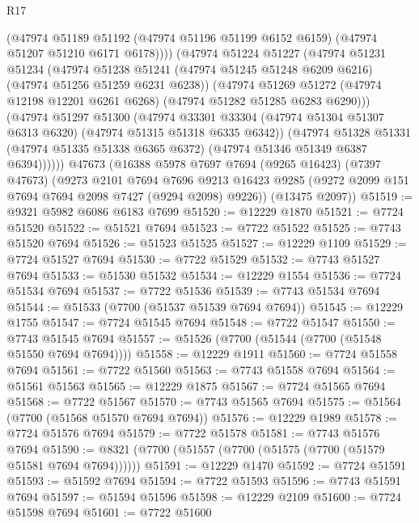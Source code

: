 \begin{lexlean}{R17}
\begin{coremodule}
            (@47974
              @51189
              @51192
              (@47974 @51196 @51199 @6152 @6159)
              (@47974 @51207 @51210 @6171 @6178))))
        (@47974
          @51224
          @51227
          (@47974
            @51231
            @51234
            (@47974
              @51238
              @51241
              (@47974 @51245 @51248 @6209 @6216)
              (@47974 @51256 @51259 @6231 @6238))
            (@47974
              @51269
              @51272
              (@47974 @12198 @12201 @6261 @6268)
              (@47974 @51282 @51285 @6283 @6290)))
          (@47974
            @51297
            @51300
            (@47974
              @33301
              @33304
              (@47974 @51304 @51307 @6313 @6320)
              (@47974 @51315 @51318 @6335 @6342))
            (@47974
              @51328
              @51331
              (@47974 @51335 @51338 @6365 @6372)
              (@47974 @51346 @51349 @6387 @6394))))))
    @47673
    (@16388
      @5978
      @7697
      @7694
      (@9265 @16423)
      (@7397 @47673)
      (@9273
        @2101
        @7694
        @7696
        @9213
        @16423
        @9285
        (@9272 @2099 @151 @7694 @7694 @2098 @7427 (@9294 @2098) @9226))
      (@13475 @2097))
@51519 := @9321 @5982 @6086 @6183 @7699
@51520 := @12229 @1870
@51521 := @7724 @51520
@51522 := @51521 @7694
@51523 := @7722 @51522
@51525 := @7743 @51520 @7694
@51526 := @51523 @51525
@51527 := @12229 @1109
@51529 := @7724 @51527 @7694
@51530 := @7722 @51529
@51532 := @7743 @51527 @7694
@51533 := @51530 @51532
@51534 := @12229 @1554
@51536 := @7724 @51534 @7694
@51537 := @7722 @51536
@51539 := @7743 @51534 @7694
@51544 := @51533 (@7700 (@51537 @51539 @7694 @7694))
@51545 := @12229 @1755
@51547 := @7724 @51545 @7694
@51548 := @7722 @51547
@51550 := @7743 @51545 @7694
@51557 := @51526 (@7700 (@51544 (@7700 (@51548 @51550 @7694 @7694))))
@51558 := @12229 @1911
@51560 := @7724 @51558 @7694
@51561 := @7722 @51560
@51563 := @7743 @51558 @7694
@51564 := @51561 @51563
@51565 := @12229 @1875
@51567 := @7724 @51565 @7694
@51568 := @7722 @51567
@51570 := @7743 @51565 @7694
@51575 := @51564 (@7700 (@51568 @51570 @7694 @7694))
@51576 := @12229 @1989
@51578 := @7724 @51576 @7694
@51579 := @7722 @51578
@51581 := @7743 @51576 @7694
@51590 := @8321 (@7700 (@51557 (@7700 (@51575 (@7700 (@51579 @51581 @7694 @7694))))))
@51591 := @12229 @1470
@51592 := @7724 @51591
@51593 := @51592 @7694
@51594 := @7722 @51593
@51596 := @7743 @51591 @7694
@51597 := @51594 @51596
@51598 := @12229 @2109
@51600 := @7724 @51598 @7694
@51601 := @7722 @51600

\end{coremodule}
\end{lexlean}

